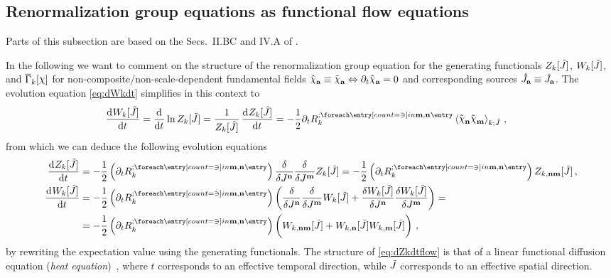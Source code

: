 \subsection{Renormalization group equations as functional flow equations}\label{subsec:RGflow}
\begin{disclaimer}
	Parts of this subsection are based on the Secs.~II.B\dash{}C and IV.A of .
\end{disclaimer}
In the following we want to comment on the structure of the renormalization group equation for the \rgscaledependent{} generating functionals $Z_k[\tilde{J}]$, $W_k[\tilde{J}]$, and $\FSeaa_k[\FSmf{\FSsf}]$ for non-composite/non-scale-dependent fundamental fields $\FSfd{\FSsf}{a}\equiv\FSffd{\FSsf}{a}\Leftrightarrow \partial_t \FSfd{\FSsf}{a}=0$ and corresponding sources $\hat{J}_{\textbf{a}}\equiv\tilde{J}_{\textbf{a}}$.
The evolution equation \eqref{eq:dWkdt} simplifies in this context to 
\begin{align}
	\dod{W_k[\FSff{J}]}{t}&=\dod{}{t}\ln Z_k[\FSff{J}]=\frac{1}{Z_k[\FSf{J}]}\dod{Z_k[\FSf{J}]}{t}
	= -\frac{1}{2}\partial_t \FSregulator{\FSidx{m},\FSidx{n}}\expectationValue{\FSffd{\FSsf}{n}\FSffd{\FSsf}{m}}{\FSff{J}}
	\label{eq:dWkdtnoscale}\,,
\end{align}
from which we can deduce the following evolution equations 
\begin{align}
	\dod{Z_k[\FSff{J}]}{t}&= -\frac{1}{2}\del{\partial_t \FSregulator{\FSidx{m},\FSidx{n}}}\frac{\delta}{\delta \FSmfu{J}{n}}\frac{\delta}{\delta \FSmfu{J}{m}} Z_{k}[\FSff{J}]
	= -\frac{1}{2}\del{\partial_t \FSregulator{\FSidx{m},\FSidx{n}}} Z_{k,\FSidx{n}\FSidx{m}}[\FSff{J}]\label{eq:dZkdtflow}\,,\\
	\dod{W_k[\FSff{J}]}{t}&= -\frac{1}{2}\del{\partial_t \FSregulator{\FSidx{m},\FSidx{n}}}\del[3]{ \frac{\delta}{\delta \FSmfu{J}{n}}\frac{\delta}{\delta \FSmfu{J}{m}} W_{k}[\FSff{J}] + \frac{\delta W_{k}[\FSff{J}]}{\delta \FSmfu{J}{n}}\frac{\delta W_{k}[\FSff{J}]}{\delta \FSmfu{J}{m}} }=\notag\\
	&= -\frac{1}{2}\del{\partial_t \FSregulator{\FSidx{m},\FSidx{n}}} \del[3]{W_{k,\FSidx{n}\FSidx{m}}[\FSff{J}]+W_{k,\FSidx{n}}[\FSff{J}]W_{k,\FSidx{m}}[\FSff{J}]}
	\label{eq:dWkdtflow}\,,
\end{align}
by rewriting the expectation value using the generating functionals.
The structure of \cref{eq:dZkdtflow} is that of a linear functional diffusion equation (\textit{heat equation})~\cite{Brydges:1987,Zumbach:1994kc,Rosten:2010vm,SkinnerScript,Salmhofer:2020Talk,Cannon:1984}, where $t$ corresponds to an effective temporal direction, while $\tilde{J}$ corresponds to an effective spatial direction.
